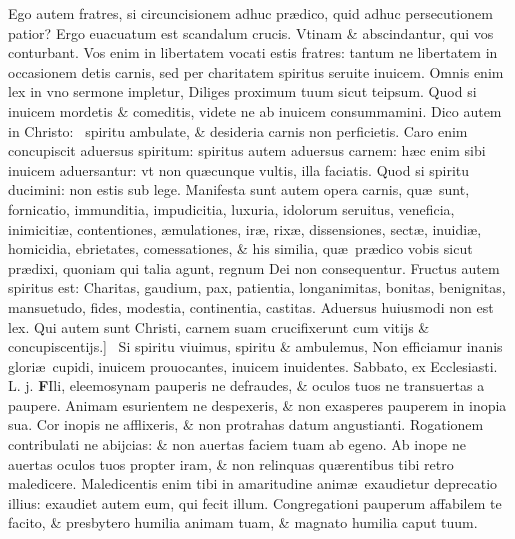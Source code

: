 \documentclass[a5paper,10pt]{book}
\def\leftmarginnote{%
	\lrmarginnote{\hskip -\marginparsep \hskip -6.5em}}
\def\rightmarginnote{%
	\lrmarginnote{\hskip\columnwidth \hskip -1em}}
\def\ae{æ}
\begin{document}
\begin{multicols*}{2}
Ego autem fratres, si circuncisionem adhuc pr\ae dico, quid adhuc persecutionem patior? Ergo euacuatum est scandalum crucis.
Vtinam \& abscindantur, qui vos
conturbant.
Vos enim in libertatem vocati estis fratres: tantum ne libertatem in occasionem detis carnis, sed per charitatem spiritus seruite inuicem.
Omnis enim lex in vno sermone impletur, Diliges proximum tuum sicut teipsum. Quod si inuicem mordetis \& comeditis, videte ne ab inuicem consummamini.
Dico autem in Christo: \textdagger \ 
spiritu\leftmarginnote{\begin{flushright}B\end{flushright}} ambulate, \& desideria carnis non perficietis.
Caro enim concupiscit aduersus spiritum: spiritus autem aduersus carnem: h\ae c enim sibi inuicem aduersantur: vt non qu\ae cunque vultis, illa faciatis.
Quod si spiritu ducimini: non estis sub lege. Manifesta sunt autem opera carnis, qu\ae \ sunt, fornicatio, immunditia, impudicitia, luxuria, idolorum seruitus, veneficia, inimiciti\ae , contentiones, \ae mulationes, ir\ae , rix\ae , dissensiones, sect\ae , inuidi\ae , homicidia, ebrietates, comessationes, \& his similia, qu\ae \ pr\ae dico vobis sicut pr\ae dixi, quoniam qui talia agunt, regnum Dei non consequentur.
Fructus autem spiritus est: Charitas, gaudium, pax, patientia, longanimitas, bonitas, benignitas, mansuetudo, fides, modestia, continentia, castitas.
Aduersus huiusmodi non est lex. Qui autem sunt Christi, carnem suam crucifixerunt cum vitijs \& concupiscentijs.] \textdagger \ 
Si\rightmarginnote{C} spiritu viuimus, spiritu \& ambulemus, Non efficiamur inanis glori\ae \ cupidi, inuicem prouocantes, inuicem inuidentes.
\newline \textswab{C} \color{red} \hypertarget{SAT-PRIMA-VAGAN}{Sabbato,} ex Ecclesiasti. L. j. \color{black}
\bookmark[dest=SAT-PRIMA-VAGAN]{SABBATO}
\vspace{-.25em}
\lettrine[lines=2]{\bfseries F}{}Ili, eleemosynam\rightmarginnote{ca. 4.} pauperis ne defraudes, \& oculos tuos ne transuertas a paupere.
Animam esurientem ne despexeris, \& non exasperes pauperem in inopia sua. Cor inopis ne afflixeris, \& non protrahas datum angustianti.
Rogationem contribulati ne abijcias: \& non auertas faciem tuam ab egeno. Ab inope ne auertas oculos tuos propter iram, \& non relinquas qu\ae rentibus tibi retro maledicere.
Maledicentis enim tibi in amaritudine anim\ae \ exaudietur deprecatio illius: exaudiet autem eum, qui fecit illum.
Congregationi pauperum affabilem te facito, \& presbytero humilia animam tuam, \& magnato humilia caput tuum.

\end{multicols*}
\end{document}
